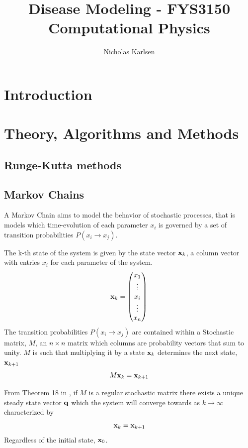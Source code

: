 \documentclass[10pt,showpacs,preprintnumbers,amsmath,amssymb,nofootinbib,aps,prl,twocolumn,groupedaddress,superscriptaddress,showkeys]{revtex4-1}
\begin{document}
\title{Disease Modeling - FYS3150 Computational Physics}
\author{Nicholas Karlsen}


\begin{abstract}
\end{abstract}

\maketitle


\section{Introduction}

\section{Theory, Algorithms and Methods}  
  \subsection{Runge-Kutta methods}
    

  \subsection{\label{sec:Markov Chains}Markov Chains}
    A Markov Chain aims to model the behavior of stochastic processes, that is models which time-evolution of each parameter $x_i$ is governed by a set of transition probabilities $P(x_i \rightarrow x_j)$.

    The k-th state of the system is given by the state vector $\vb x_k$, a column vector with entries $x_i$ for each parameter of the system.
      \begin{equation}
        \vb x_k = \mqty(x_1 \\ \vdots \\ x_i \\ \vdots \\ x_n)
      \end{equation}
    The transition probabilities $P(x_i\rightarrow x_j)$ are contained within a Stochastic matrix, $M$, an $n\times n$ matrix which columns are probability vectors that sum to unity. $M$ is such that multiplying it by a state $\vb x_k$ determines the next state, $\vb x_{k+1}$
      \begin{equation}
        M \vb x_k = \vb x_{k+1}
      \end{equation}


    From Theorem 18 in \textcite[p.~277]{linalg_lays}, if $M$ is a regular stochastic matrix there exists a unique steady state vector $\vb q$ which the system will converge towards as $k\rightarrow \infty$ characterized by
    \begin{equation}
      \vb x_k = \vb x_{k+1} 
    \end{equation}
    Regardless of the initial state, $\vb x_0$.
\end{document}
